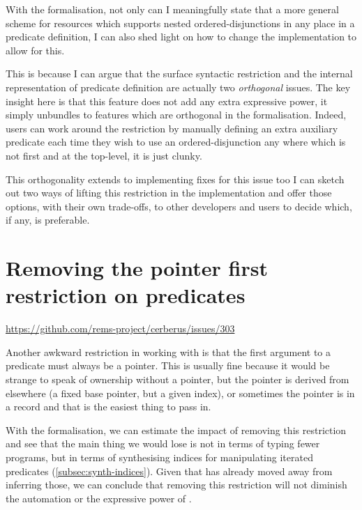 With the formalisation, not only can I meaningfully state that a more general
scheme for resources which supports nested ordered-disjunctions in any place in
a predicate definition, I can also shed light on how to change the
implementation to allow for this.

This is because I can argue that the surface syntactic restriction and the
internal representation of predicate definition are actually two
\emph{orthogonal} issues. The key insight here is that this feature does not
add any extra expressive power, it simply unbundles to features which are
orthogonal in the formalisation. Indeed, users can work around the restriction
by manually defining an extra auxiliary predicate each time they wish to use an
ordered-disjunction any where which is not first and at the top-level, it is just
clunky.

This orthogonality extends to implementing fixes for this issue too
\textemdash{} I can sketch out two ways of lifting this restriction in the
implementation and offer those options, with their own trade-offs, to other
developers and users to decide which, if any, is preferable.

\section{Removing the pointer first restriction on predicates}\label{sec:rm-ptr-first}
\url{https://github.com/rems-project/cerberus/issues/303}

Another awkward restriction in working with  is that the first argument
to a predicate must always be a pointer. This is usually fine because it would
be strange to speak of ownership without a pointer, but the pointer is derived
from elsewhere (a fixed base pointer, but a given index), or sometimes the
pointer is in a record and that is the easiest thing to pass in.

With the formalisation, we can estimate the impact of removing this restriction
and see that the main thing we would lose is not in terms of typing fewer
programs, but in terms of synthesising indices for manipulating iterated
predicates (\cref{subsec:synth-indices}). Given that  has already moved
away from inferring those, we can
conclude that removing this restriction will not diminish the automation or the
expressive power of .

